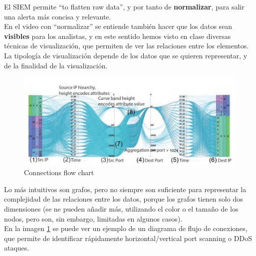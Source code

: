 El SIEM permite ``to flatten raw data'', y por tanto de \textbf{normalizar}, para salir una alerta más concisa y relevante.\\
En el video con ``normalizar'' se entiende también hacer que los datos sean \textbf{visibles} para los analistas, y en este sentido hemos visto en clase diversas técnicas de visualización, que permiten de ver las relaciones entre los elementos.\\
La tipología de visualización depende de los datos que se quieren representar, y de la finalidad de la visualización.
\begin{paracol}{2}
   

   \begin{figure}[htbp]
      \centering
      \includegraphics[width=0.95\columnwidth]{images/06/chart.png}
      \caption{Connections flow chart}
      \label{fig:06/chart}
   \end{figure}

   \switchcolumn
   \colfill
   Lo más intuitivos son grafos, pero no siempre son suficiente para representar la complejidad de las relaciones entre los datos, porque los grafos tienen solo dos dimensiones (se ne pueden añadir más, utilizando el color o el tamaño de los nodos, pero son, sin embargo, limitadas en algunos casos).\\
   En la imagen \ref{fig:06/chart} se puede ver un ejemplo de un diagrama de flujo de conexiones, que permite de identificar rápidamente horizontal/vertical port scanning o DDoS ataques.
   \colfill
\end{paracol}

